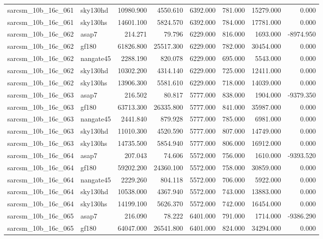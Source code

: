 \begin{tabular}{llrrrrrr}
sarcsm\_10b\_16c\_061 & sky130hd & 10980.900 & 4550.610 & 6392.000 & 781.000 & 15279.000 & 0.000 \\
sarcsm\_10b\_16c\_061 & sky130hs & 14601.100 & 5824.570 & 6392.000 & 784.000 & 17781.000 & 0.000 \\
sarcsm\_10b\_16c\_062 & asap7 & 214.271 & 79.796 & 6229.000 & 816.000 & 1693.000 & -8974.950 \\
sarcsm\_10b\_16c\_062 & gf180 & 61826.800 & 25517.300 & 6229.000 & 782.000 & 30454.000 & 0.000 \\
sarcsm\_10b\_16c\_062 & nangate45 & 2288.190 & 820.078 & 6229.000 & 695.000 & 5543.000 & 0.000 \\
sarcsm\_10b\_16c\_062 & sky130hd & 10302.200 & 4314.140 & 6229.000 & 725.000 & 12411.000 & 0.000 \\
sarcsm\_10b\_16c\_062 & sky130hs & 13906.300 & 5581.610 & 6229.000 & 718.000 & 14039.000 & 0.000 \\
sarcsm\_10b\_16c\_063 & asap7 & 216.502 & 80.817 & 5777.000 & 838.000 & 1904.000 & -9379.350 \\
sarcsm\_10b\_16c\_063 & gf180 & 63713.300 & 26335.800 & 5777.000 & 841.000 & 35987.000 & 0.000 \\
sarcsm\_10b\_16c\_063 & nangate45 & 2441.840 & 879.928 & 5777.000 & 785.000 & 6981.000 & 0.000 \\
sarcsm\_10b\_16c\_063 & sky130hd & 11010.300 & 4520.590 & 5777.000 & 807.000 & 14749.000 & 0.000 \\
sarcsm\_10b\_16c\_063 & sky130hs & 14735.500 & 5854.940 & 5777.000 & 806.000 & 16912.000 & 0.000 \\
sarcsm\_10b\_16c\_064 & asap7 & 207.043 & 74.606 & 5572.000 & 756.000 & 1610.000 & -9393.520 \\
sarcsm\_10b\_16c\_064 & gf180 & 59202.200 & 24360.100 & 5572.000 & 758.000 & 30859.000 & 0.000 \\
sarcsm\_10b\_16c\_064 & nangate45 & 2229.260 & 804.118 & 5572.000 & 706.000 & 5922.000 & 0.000 \\
sarcsm\_10b\_16c\_064 & sky130hd & 10538.000 & 4367.940 & 5572.000 & 743.000 & 13883.000 & 0.000 \\
sarcsm\_10b\_16c\_064 & sky130hs & 14199.100 & 5626.370 & 5572.000 & 742.000 & 16454.000 & 0.000 \\
sarcsm\_10b\_16c\_065 & asap7 & 216.090 & 78.222 & 6401.000 & 791.000 & 1714.000 & -9386.290 \\
sarcsm\_10b\_16c\_065 & gf180 & 64047.000 & 26541.800 & 6401.000 & 824.000 & 34294.000 & 0.000 \\

\end{tabular}
